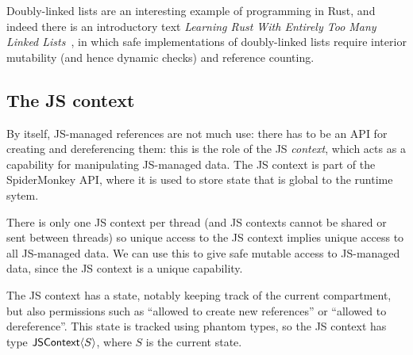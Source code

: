 Doubly-linked lists are an interesting example of programming in Rust,
and indeed there is an introductory text \emph{Learning Rust With
  Entirely Too Many Linked Lists}~\cite{too-many-lists}, in which safe
implementations of doubly-linked lists require interior mutability
(and hence dynamic checks) and reference counting.

\subsection{The JS context}

By itself, JS-managed references are not much use: there has to be an
API for creating and dereferencing them: this is the role of the
JS \emph{context}, which acts as a capability for manipulating
JS-managed data. The JS context is part of the SpiderMonkey API,
where it is used to store state that is global to the runtime sytem.

There is only one JS context per thread (and JS contexts cannot be shared
or sent between threads) so unique access to the JS context implies unique
access to all JS-managed data. We can use this to give safe mutable access
to JS-managed data, since the JS context is a unique capability.

The JS context has a state, notably keeping track of the current
compartment, but also permissions such as ``allowed to create new
references'' or ``allowed to dereference''.  This state is tracked
using phantom types, so the JS context
has type $\mathsf{JSContext}\langle S\rangle$, where $S$ is the current state.


